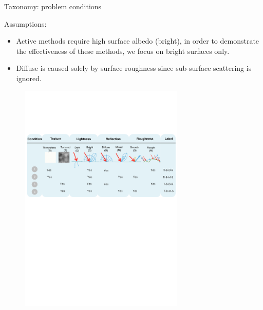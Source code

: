 \documentclass[10pt]{beamer}
\begin{document}
\begin{frame}{Taxonomy: problem conditions}

Assumptions:
\begin{itemize}
\item Active methods require high surface albedo (bright), in order to demonstrate the effectiveness of these methods, we focus on bright surfaces only.
\item Diffuse is caused solely by surface roughness since sub-surface scattering is ignored.
\end{itemize}

\begin{figure}[h]
\includegraphics[width=0.7\textwidth]{taxo/prob_cond}
\end{figure}

\end{frame}

\end{document}
